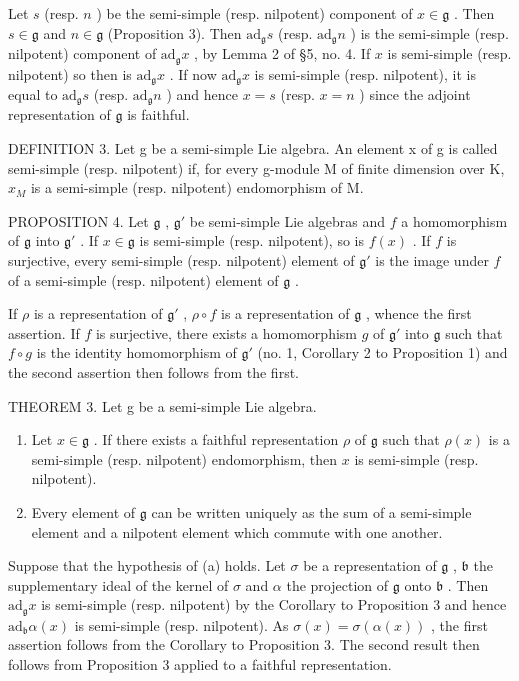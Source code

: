 Let \(s\) (resp. \(n\) ) be the semi-simple (resp. nilpotent) component of \(x \in \mathfrak{g}\) . Then \(s \in \mathfrak{g}\) and \(n \in \mathfrak{g}\) (Proposition 3). Then \(\mathrm{ad}_{\mathfrak{g}} s\) (resp. \(\mathrm{ad}_{\mathfrak{g}} n\) ) is the semi-simple (resp. nilpotent) component of \(\mathrm{ad}_{\mathfrak{g}} x\) , by Lemma 2 of §5, no. 4. If \(x\) is semi-simple (resp. nilpotent) so then is \(\mathrm{ad}_{\mathfrak{g}} x\) . If now \(\mathrm{ad}_{\mathfrak{g}} x\) is semi-simple (resp. nilpotent), it is equal to \(\mathrm{ad}_{\mathfrak{g}} s\) (resp. \(\mathrm{ad}_{\mathfrak{g}} n\) ) and hence \(x = s\) (resp. \(x = n\) ) since the adjoint representation of \(\mathfrak{g}\) is faithful.

DEFINITION 3. Let g be a semi-simple Lie algebra. An element x of g is called semi-simple (resp. nilpotent) if, for every g-module M of finite dimension over K, \(x_{M}\) is a semi-simple (resp. nilpotent) endomorphism of M.

PROPOSITION 4. Let \(\mathfrak{g}\) , \(\mathfrak{g}'\) be semi-simple Lie algebras and \(f\) a homomorphism of \(\mathfrak{g}\) into \(\mathfrak{g}'\) . If \(x \in \mathfrak{g}\) is semi-simple (resp. nilpotent), so is \(f(x)\) . If \(f\) is surjective, every semi-simple (resp. nilpotent) element of \(\mathfrak{g}'\) is the image under \(f\) of a semi-simple (resp. nilpotent) element of \(\mathfrak{g}\) .

If \(\rho\) is a representation of \(\mathfrak{g}'\) , \(\rho \circ f\) is a representation of \(\mathfrak{g}\) , whence the first assertion. If \(f\) is surjective, there exists a homomorphism \(g\) of \(\mathfrak{g}'\) into \(\mathfrak{g}\) such that \(f \circ g\) is the identity homomorphism of \(\mathfrak{g}'\) (no. 1, Corollary 2 to Proposition 1) and the second assertion then follows from the first.

THEOREM 3. Let g be a semi-simple Lie algebra.

\begin{enumerate}
\def\labelenumi{(\alph{enumi})}
\item
  Let \(x \in \mathfrak{g}\) . If there exists a faithful representation \(\rho\) of \(\mathfrak{g}\) such that \(\rho(x)\) is a semi-simple (resp. nilpotent) endomorphism, then \(x\) is semi-simple (resp. nilpotent).
\item
  Every element of \(\mathfrak{g}\) can be written uniquely as the sum of a semi-simple element and a nilpotent element which commute with one another.
\end{enumerate}

Suppose that the hypothesis of (a) holds. Let \(\sigma\) be a representation of \(\mathfrak{g}\) , \(\mathfrak{b}\) the supplementary ideal of the kernel of \(\sigma\) and \(\alpha\) the projection of \(\mathfrak{g}\) onto \(\mathfrak{b}\) . Then \(\mathrm{ad}_{\mathfrak{g}}x\) is semi-simple (resp. nilpotent) by the Corollary to Proposition 3 and hence \(\mathrm{ad}_{\mathfrak{b}}\alpha(x)\) is semi-simple (resp. nilpotent). As \(\sigma(x)=\sigma(\alpha(x))\) , the first assertion follows from the Corollary to Proposition 3. The second result then follows from Proposition 3 applied to a faithful representation.

